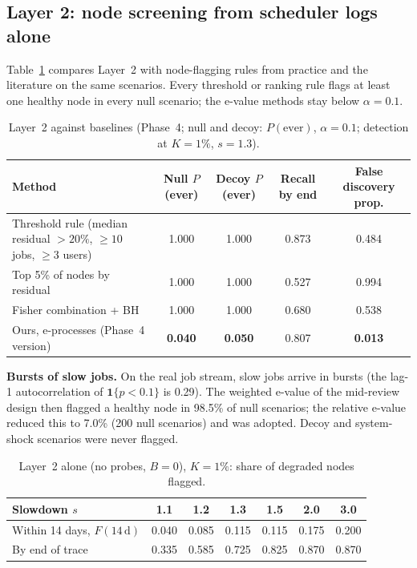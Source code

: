 \documentclass[10pt,a4paper]{article}
\begin{document}
\subsection{Layer 2: node screening from scheduler logs alone}
Table~\ref{tab:l2base} compares Layer~2 with node-flagging rules from practice and the literature on the same scenarios. Every threshold or ranking rule flags at least one healthy node in every null scenario; the e-value methods stay below $\alpha = 0.1$.

\begin{table}[H]
\centering
\caption{Layer~2 against baselines (Phase~4; null and decoy: $P(\text{ever})$, $\alpha = 0.1$; detection at $K = 1\%$, $s = 1.3$).}
\label{tab:l2base}
\small
\begin{tabularx}{\textwidth}{@{}Xcccc@{}}
\toprule
Method & Null $P$(ever) & Decoy $P$(ever) & Recall by end & False discovery prop.\\
\midrule
Threshold rule (median residual $>20\%$, $\ge 10$ jobs, $\ge 3$ users) & 1.000 & 1.000 & 0.873 & 0.484\\
Top 5\% of nodes by residual & 1.000 & 1.000 & 0.527 & 0.994\\
Fisher combination + BH & 1.000 & 1.000 & 0.680 & 0.538\\
Ours, e-processes (Phase~4 version) & \textbf{0.040} & \textbf{0.050} & 0.807 & \textbf{0.013}\\
\bottomrule
\end{tabularx}
\end{table}

\textbf{Bursts of slow jobs.} On the real job stream, slow jobs arrive in bursts (the lag-1 autocorrelation of $\mathbf 1\{p < 0.1\}$ is 0.29). The weighted e-value of the mid-review design then flagged a healthy node in 98.5\% of null scenarios; the relative e-value reduced this to 7.0\% (200 null scenarios) and was adopted. Decoy and system-shock scenarios were never flagged.

\begin{table}[H]
\centering
\caption{Layer~2 alone (no probes, $B = 0$), $K = 1\%$: share of degraded nodes flagged.}
\label{tab:l2speed}
\small
\begin{tabular}{@{}lcccccc@{}}
\toprule
Slowdown $s$ & 1.1 & 1.2 & 1.3 & 1.5 & 2.0 & 3.0\\
\midrule
Within 14 days, $F(14\,\mathrm{d})$ & 0.040 & 0.085 & 0.115 & 0.115 & 0.175 & 0.200\\
By end of trace & 0.335 & 0.585 & 0.725 & 0.825 & 0.870 & 0.870\\
\bottomrule
\end{tabular}
\end{table}
\end{document}
